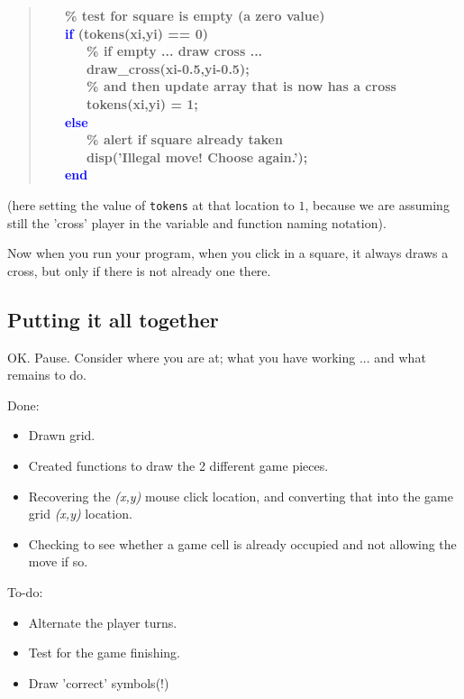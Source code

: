 \documentclass{tufte-book} %
\newenvironment{docspecbold}{\begin{quotation}\ttfamily\bfseries\parskip0pt\parindent0pt\ignorespaces}{\end{quotation}}
\begin{document}
\begin{docspecbold}
\ \ \ \textcolor[rgb]{0,0.501961,0}{\% test for square is empty (a zero value)}\\
\ \ \     \textcolor{blue}{if} (tokens(xi,yi) == 0)\\
\ \ \ \ \ \ \textcolor[rgb]{0,0.501961,0}{\% if empty ... draw cross ...}\\
\ \ \ \ \ \         draw\_cross(xi-0.5,yi-0.5);\\
\ \ \ \ \ \ \textcolor[rgb]{0,0.501961,0}{\% and then update array that is now has a cross}\\
\ \ \ \ \ \        tokens(xi,yi) = 1;\\
\ \ \     \textcolor{blue}{else}\\
\ \ \ \ \ \ \textcolor[rgb]{0,0.501961,0}{\% alert if square already taken}\\
\ \ \ \ \ \         disp(\textcolor[rgb]{1,0,1}{'Illegal move! Choose again.'});\\
\ \ \     \textcolor{blue}{end}
\end{docspecbold}
(here setting the value of \texttt{tokens} at that location to \(1\), because we are assuming still the 'cross' player in the variable and function naming notation).

Now when you run your program, when you click in a square, it always draws a cross, but only if there is not already one there.


\subsection{Putting it all together}

OK. Pause. Consider where you are at; what you have working ... and what remains to do.

Done:
\begin{itemize}[noitemsep]
\setlength{\itemindent}{.2in}
\item Drawn grid.
\item Created functions to draw the 2 different game pieces.
\item Recovering the \textit{(x,y)} mouse click location, and converting that into the game grid \textit{(x,y)} location.
\item Checking to see whether a game cell is already occupied and not allowing the move if so.
\end{itemize}

To-do:
\begin{itemize}[noitemsep]
\setlength{\itemindent}{.2in}
\item Alternate the player turns.
\item Test for the game finishing.
\item Draw 'correct' symbols(!)
\end{itemize}
\end{document}
